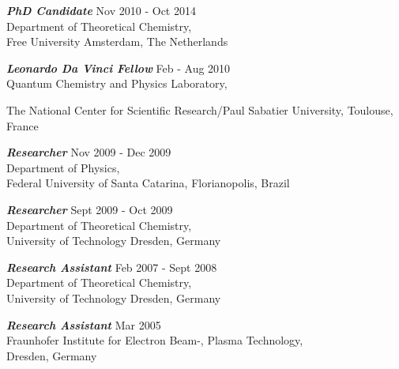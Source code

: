\documentclass[line,margin]{res}
\begin{document}
\begin{resume}
{\sl\textbf{PhD Candidate}} \hfill\smallskip Nov 2010 - Oct 2014\\
                \hspace*{1cm} Department of Theoretical Chemistry,\\ 
                \hspace*{1cm} Free University Amsterdam, The Netherlands
                
                {\sl\textbf{Leonardo Da Vinci Fellow}} \hfill\smallskip Feb - Aug 2010\\
                \hspace*{1cm} Quantum Chemistry and Physics Laboratory,\\ 
                \hspace*{1cm} \parbox[t]{12cm}{The National Center for Scientific Research/Paul Sabatier University, Toulouse, France}
                 
                {\sl\textbf{Researcher}} \hfill\smallskip Nov 2009 - Dec 2009 \\
                \hspace*{1cm} Department of Physics,\\
                \hspace*{1cm} Federal University of Santa Catarina, Florianopolis, Brazil

                {\sl\textbf{Researcher}} \hfill\smallskip Sept 2009 - Oct 2009 \\
               \hspace*{1cm} Department of Theoretical Chemistry,\\
               \hspace*{1cm} University of Technology Dresden, Germany


                 {\sl\textbf{Research Assistant}} \hfill\smallskip Feb 2007 - Sept 2008 \\
                \hspace*{1cm} Department of Theoretical Chemistry,\\
                \hspace*{1cm} University of Technology Dresden, Germany
                
                {\sl\textbf{Research Assistant}} \hfill\smallskip Mar 2005 \\
                \hspace*{1cm} Fraunhofer Institute for Electron Beam-, Plasma Technology,\\
                \hspace*{1cm} Dresden, Germany


\end{resume}
\end{document}
